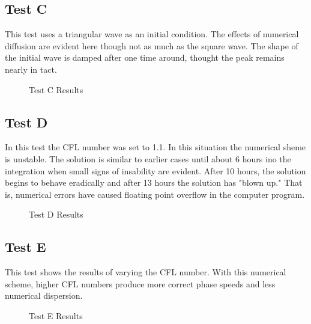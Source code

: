 \documentclass[11pt,twoside]{article}
\begin{document}
\subsection{Test C}

This test uses a triangular wave as an initial condition. The effects of numerical diffusion are evident here though not as much as the square wave. The shape of the initial wave is damped after one time around, thought the peak remains nearly in tact. 

\begin{figure}[!h]
\centering
{}
\caption{Test C Results}
\end{figure}

\subsection{Test D}

In this test the CFL number was set to 1.1. In this situation the numerical sheme is unstable. The solution is similar to earlier cases until about 6 hours ino the integration when small signs of insability are evident. After 10 hours, the solution begins to behave eradically and after 13 hours the solution has "blown up." That is, numerical errors have caused floating point overflow in the computer program. 

\begin{figure}[!h]
\centering
{}
\caption{Test D Results}
\end{figure}

\subsection{Test E}

This test shows the results of varying the CFL number.  With this numerical scheme, higher CFL numbers produce more correct phase speeds and less numerical dispersion. 


\begin{figure}[!h]
\centering
{}
\caption{Test E Results}
\end{figure}
\end{document}
